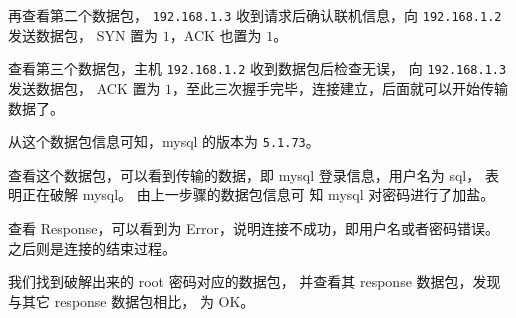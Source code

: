 再查看第二个数据包，
\texttt{192.168.1.3} 收到请求后确认联机信息，向 \texttt{192.168.1.2} 发送数据包，
SYN 置为 $1$，ACK 也置为 $1$。

查看第三个数据包，主机 \texttt{192.168.1.2} 收到数据包后检查无误，
向 \texttt{192.168.1.3} 发送数据包，
ACK 置为 $1$，至此三次握手完毕，连接建立，后面就可以开始传输数据了。

从这个数据包信息可知，mysql 的版本为 \texttt{5.1.73}。

查看这个数据包，可以看到传输的数据，即 mysql 登录信息，用户名为 sql，
表明正在破解 mysql。
由上一步骤的数据包信息可
知 mysql 对密码进行了加盐。

查看 Response，可以看到为 Error，说明连接不成功，即用户名或者密码错误。
之后则是连接的结束过程。

我们找到破解出来的 root 密码对应的数据包，
并查看其 response 数据包，发现与其它 response 数据包相比，
为 OK。
%
